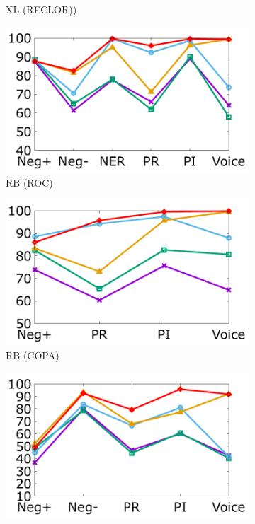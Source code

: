 \begin{figure}[!th]
\begin{subfigure}[b]{0.23\textwidth}
\caption{XL (RECLOR))}
\label{fig:reclor_xlnet}
\end{subfigure}
\newpage
\begin{subfigure}[b]{0.23\textwidth}
\centering
\includegraphics[width=\columnwidth]{data/roc_roberta.pdf}
\caption{RB (ROC)}
\label{fig:roc_roberta}
\end{subfigure}
\hfill
\begin{subfigure}[b]{0.23\textwidth}
\centering
\includegraphics[width=\columnwidth]{data/copa_roberta.pdf}
\caption{RB (COPA)}
\label{fig:copa_roberta}
\end{subfigure}
\hfill
\begin{subfigure}[b]{0.23\textwidth}
\centering
\includegraphics[width=\columnwidth]{data/arct_roberta.pdf}

\end{subfigure}
\end{figure}
